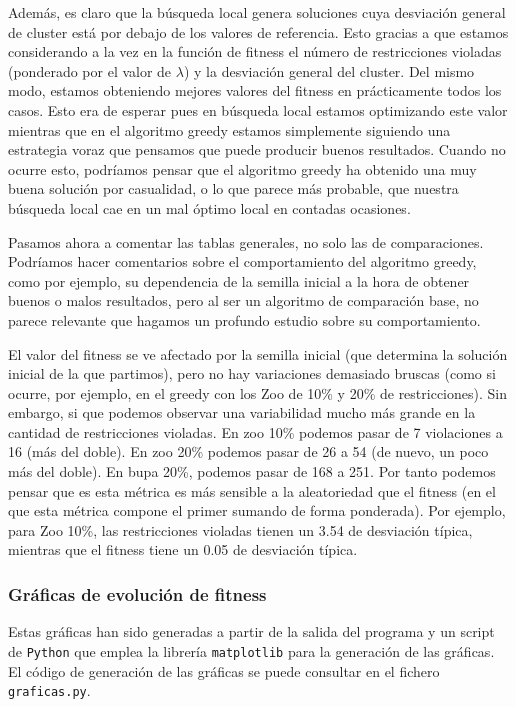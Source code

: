 \documentclass[11pt]{article}
\begin{document}
Además, es claro que la búsqueda local genera soluciones cuya desviación general de cluster está por debajo de los valores de referencia. Esto gracias a que estamos considerando a la vez en la función de fitness el número de restricciones violadas (ponderado por el valor de $\lambda$) y la desviación general del cluster. Del mismo modo, estamos obteniendo mejores valores del fitness en prácticamente todos los casos. Esto era de esperar pues en búsqueda local estamos optimizando este valor mientras que en el algoritmo greedy estamos simplemente siguiendo una estrategia voraz que pensamos que puede producir buenos resultados. Cuando no ocurre esto, podríamos pensar que el algoritmo greedy ha obtenido una muy buena solución por casualidad, o lo que parece más probable, que nuestra búsqueda local cae en un mal óptimo local en contadas ocasiones.

Pasamos ahora a comentar las tablas generales, no solo las de comparaciones. Podríamos hacer comentarios sobre el comportamiento del algoritmo greedy, como por ejemplo, su dependencia de la semilla inicial a la hora de obtener buenos o malos resultados, pero al ser un algoritmo de comparación base, no parece relevante que hagamos un profundo estudio sobre su comportamiento.

El valor del fitness se ve afectado por la semilla inicial (que determina la solución inicial de la que partimos), pero no hay variaciones demasiado bruscas (como si ocurre, por ejemplo, en el greedy con los Zoo de 10\% y 20\% de restricciones). Sin embargo, si que podemos observar una variabilidad mucho más grande en la cantidad de restricciones violadas. En zoo 10\% podemos pasar de 7 violaciones a 16 (más del doble). En zoo 20\% podemos pasar de 26 a 54 (de nuevo, un poco más del doble). En bupa 20\%, podemos pasar de 168 a 251. Por tanto podemos pensar que es esta métrica es más sensible a la aleatoriedad que el fitness (en el que esta métrica compone el primer sumando de forma ponderada). Por ejemplo, para Zoo 10\%, las restricciones violadas tienen un
3.54 de desviación típica, mientras que el fitness tiene un 0.05 de desviación típica.

\subsubsection{Gráficas de evolución de fitness}

Estas gráficas han sido generadas a partir de la salida del programa y un script de \lstinline{Python} que emplea la librería \lstinline{matplotlib} para la generación de las gráficas. El código de generación de las gráficas se puede consultar en el fichero \lstinline{graficas.py}.
\end{document}
